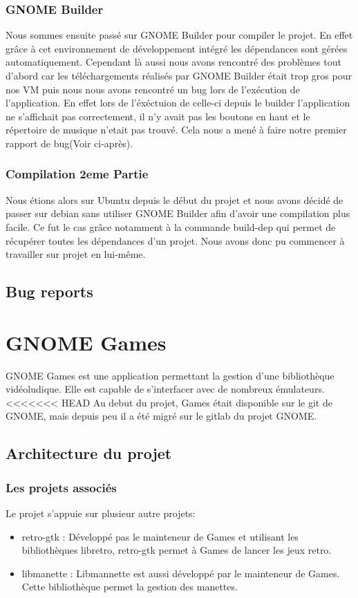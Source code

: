 \documentclass[12pt]{report}
\begin{document}
\subsection{GNOME Builder}
Nous sommes ensuite passé sur GNOME Builder pour compiler le projet.
En effet grâce à cet environnement de développement intégré les 
dépendances sont gérées automatiquement. Cependant là aussi nous
avons rencontré des problèmes tout d'abord car les téléchargements
réalisés par GNOME Builder était trop gros pour nos VM puis nous 
nous avons rencontré un bug lors de l’exécution de l'application.
En effet lors de l'éxéctuion de celle-ci depuis le builder l'application
ne s'affichait pas correctement, il n'y avait pas les boutons en haut
et le répertoire de musique n'etait pas trouvé. Cela nous a mené à 
faire notre premier rapport de bug(Voir ci-après).

\subsection{Compilation 2eme Partie}
Nous étions alors sur Ubuntu depuis le début du projet et nous avons
décidé de passer sur debian sans utiliser GNOME Builder afin d'avoir 
une compilation plus facile. Ce fut le cas grâce notamment à la 
commande build-dep qui permet de récupérer toutes les dépendances d'un 
projet. Nous avons donc pu commencer à travailler sur projet en 
lui-même.

\section{Bug reports}

\newpage
\chapter{GNOME Games}
GNOME Games est une application permettant la gestion d'une
bibliothèque vidéoludique. Elle est capable de s'interfacer avec de
nombreux émulateurs.
<<<<<<< HEAD
Au debut du projet, Games était disponible sur le git de GNOME, mais 
depuis peu il a été migré sur le gitlab du projet GNOME.

\section{Architecture du projet}
\subsection{Les projets associés}
Le projet s'appuie sur plusieur autre projets:
\begin{itemize}
\item retro-gtk : Développé pas le mainteneur de Games et utilisant les bibliothèques libretro,
retro-gtk permet à Games de lancer les jeux retro.
\item libmanette : Libmannette est aussi développé par le mainteneur de Games. Cette bibliothèque
permet la gestion des manettes.
\end{itemize}
\end{document}
